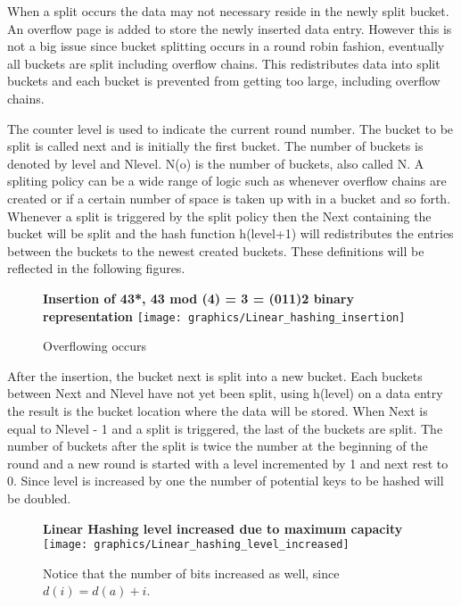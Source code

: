 \documentclass[letterpaper, 12pt]{article}
\begin{document}
When a split occurs the data may not necessary reside in the newly split bucket. An overflow page is
added to store the newly inserted data entry. However this is not a big issue since bucket splitting
occurs in a round robin fashion, eventually all buckets are split including overflow chains.
This redistributes data into split buckets and each bucket is prevented from getting too large,
including overflow chains.
\par\vspace{\baselineskip}
The counter level is used to indicate the current round number. The bucket to be split is called
next and is initially the first bucket. The number of buckets is denoted by level and Nlevel.
N(o) is the number of buckets, also called N. A spliting policy can be a wide range of logic
such as whenever overflow chains are created or if a certain number of space is taken up with
in a bucket and so forth. Whenever a split is triggered by the split policy then the Next containing
the bucket will be split and the hash function h(level+1) will redistributes the entries
between the buckets to the newest created buckets. These definitions will be reflected in the following
figures.

\begin{figure}
  \centering
  \textbf{Insertion of 43*, 43 mod (4) = 3 = (011)2 binary representation}
  \texttt{[image: graphics/Linear\_hashing\_insertion]}
  \cite{ramakrishnan2000database}
  \caption{Overflowing occurs}
\end{figure}

\par\vspace{\baselineskip}
After the insertion, the bucket next is split into a new bucket. Each buckets between Next and Nlevel have not yet been split,
using h(level) on a data entry the result is the bucket location where the data will be stored.
When Next is equal to Nlevel - 1 and a split is triggered, the last of the buckets are split. The 
number of buckets after the split is twice the number at the beginning of the round and a new round is 
started with a level incremented by 1 and next rest to 0. Since level is increased by one the number 
of potential keys to be hashed will be doubled.
\par\vspace{\baselineskip}
\begin{figure}
  \centering
  \textbf{Linear Hashing level increased due to maximum capacity}
  \texttt{[image: graphics/Linear\_hashing\_level\_increased]}
  \cite{ramakrishnan2000database}
  \caption{Notice that the number of bits increased as well, since $d(i) = d(a) + i$.}
\end{figure}
\end{document}
